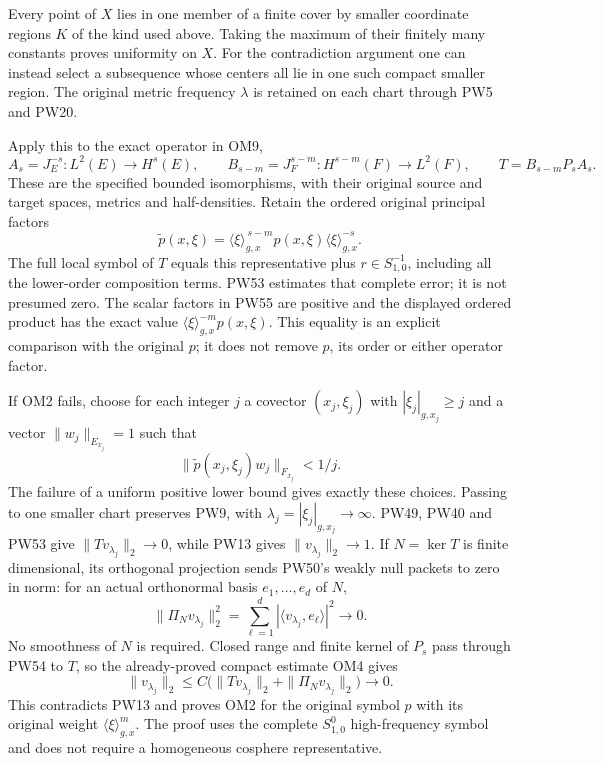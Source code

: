 \documentclass[
  11pt,
]{article}
\begin{document}
Every point of \(X\) lies in one member of a finite cover by smaller
coordinate regions \(K\) of the kind used above. Taking the maximum of
their finitely many constants proves uniformity on \(X\). For the
contradiction argument one can instead select a subsequence whose
centers all lie in one such compact smaller region. The original metric
frequency \(\lambda\) is retained on each chart through PW5 and PW20.

Apply this to the exact operator in OM9, \[
 A_s=J_E^{-s}:L^2(E)\longrightarrow H^s(E),\qquad
 B_{s-m}=J_F^{s-m}:H^{s-m}(F)\longrightarrow L^2(F),\qquad
 T=B_{s-m}P_sA_s .
 \tag{PW54}
\] These are the specified bounded isomorphisms, with their original
source and target spaces, metrics and half-densities. Retain the ordered
original principal factors \[
 \widetilde p(x,\xi)
      =\langle\xi\rangle_{g,x}^{\,s-m}
          p(x,\xi)\langle\xi\rangle_{g,x}^{-s}.
 \tag{PW55}
\] The full local symbol of \(T\) equals this representative plus
\(r\in S^{-1}_{1,0}\), including all the lower-order composition terms.
PW53 estimates that complete error; it is not presumed zero. The scalar
factors in PW55 are positive and the displayed ordered product has the
exact value \(\langle\xi\rangle_{g,x}^{-m}p(x,\xi)\). This equality is
an explicit comparison with the original \(p\); it does not remove
\(p\), its order or either operator factor.

If OM2 fails, choose for each integer \(j\) a covector \((x_j,\xi_j)\)
with \(|\xi_j|_{g,x_j}\geq j\) and a vector \(\|w_j\|_{E_{x_j}}=1\) such
that \[
 \|\widetilde p(x_j,\xi_j)w_j\|_{F_{x_j}}<1/j .
 \tag{PW56}
\] The failure of a uniform positive lower bound gives exactly these
choices. Passing to one smaller chart preserves PW9, with
\(\lambda_j=|\xi_j|_{g,x_j}\to\infty\). PW49, PW40 and PW53 give
\(\|Tv_{\lambda_j}\|_2\to0\), while PW13 gives
\(\|v_{\lambda_j}\|_2\to1\). If \(N=\ker T\) is finite dimensional, its
orthogonal projection sends PW50's weakly null packets to zero in norm:
for an actual orthonormal basis \(e_1,\ldots,e_d\) of \(N\), \[
 \|\Pi_Nv_{\lambda_j}\|_2^2
       =\sum_{\ell=1}^d
               |\langle v_{\lambda_j},e_\ell\rangle|^2\longrightarrow0.
 \tag{PW57}
\] No smoothness of \(N\) is required. Closed range and finite kernel of
\(P_s\) pass through PW54 to \(T\), so the already-proved compact
estimate OM4 gives \[
 \|v_{\lambda_j}\|_2
 \leq C\bigl(\|Tv_{\lambda_j}\|_2+
                 \|\Pi_Nv_{\lambda_j}\|_2\bigr)\longrightarrow0.
 \tag{PW58}
\] This contradicts PW13 and proves OM2 for the original symbol \(p\)
with its original weight \(\langle\xi\rangle_{g,x}^{m}\). The proof uses
the complete \(S^0_{1,0}\) high-frequency symbol and does not require a
homogeneous cosphere representative.
\end{document}
